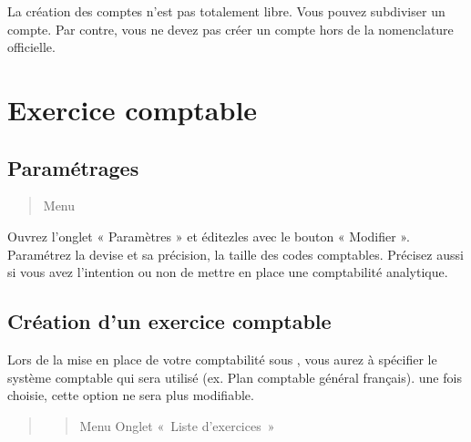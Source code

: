 \documentclass[a4paper,10pt,oneside,french]{sphinxmanual}
\begin{document}
\sphinxAtStartPar
La création des comptes n’est pas totalement libre. Vous pouvez subdiviser un compte. Par contre, vous ne devez pas créer un compte hors de la nomenclature officielle.


\section{Exercice comptable}
\label{\detokenize{accounting/fiscalyear:exercice-comptable}}\label{\detokenize{accounting/fiscalyear::doc}}

\subsection{Paramétrages}
\label{\detokenize{accounting/fiscalyear:parametrages}}\begin{quote}

\sphinxAtStartPar
Menu 
\end{quote}

\sphinxAtStartPar
Ouvrez l’onglet « Paramètres » et éditez\sphinxhyphen{}les avec le bouton « Modifier ». Paramétrez la devise et sa précision, la taille des codes comptables. Précisez aussi si vous avez l’intention ou non de mettre en place une comptabilité analytique.
\begin{quote}

\noindent{}
\end{quote}


\subsection{Création d’un exercice comptable}
\label{\detokenize{accounting/fiscalyear:creation-d-un-exercice-comptable}}
\sphinxAtStartPar
Lors de la mise en place de votre comptabilité sous , vous aurez à spécifier le système comptable qui sera utilisé (ex. Plan comptable général français).  une fois choisie, cette option ne sera plus modifiable.
\begin{quote}
\begin{quote}

\sphinxAtStartPar
Menu  \sphinxhyphen{} Onglet « Liste d’exercices »
\end{quote}

\noindent{}
\end{quote}
\end{document}
